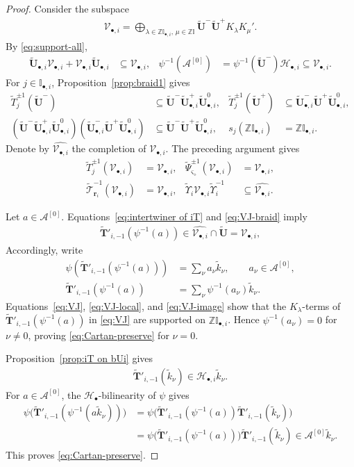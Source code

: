 \documentclass[a4paper,reqno,12pt]{amsart}
\numberwithin{equation}{section}
\theoremstyle{definition}
\theoremstyle{plain}
\theoremstyle{definition}
\def\Z{\mathbb Z}
\def\I{\mathbb I}
\def\bIi{\I_{\bullet,i}}
\def\br{\mathbf r}
\def\tU{\widetilde{\mathbf U}}
\def \tbiU{\tU_{\bullet,i}}
\def\tTD{\widetilde T}
\def\tT{\widetilde{\mathscr T}}
\def\tTT{\widetilde{\mathbf T}}
\def\tPsi{\widetilde\Psi}
\def\tk{\widetilde k}
\def\tfX{\widetilde\Upsilon}
\def\cA{\mathcal A}
\def\cH{\mathcal H}
\def\cV{\mathcal V}
\def\bvs{\boldsymbol\varsigma}
\def\dm{\diamond}
\def \bvs{{\boldsymbol{\varsigma}}}
\newcommand{\tTa}[1]{\tTT'_{#1,-1}}
\begin{document}
\begin{proof}
Consider the subspace
\begin{align}
\cV_{\bullet,i}=\bigoplus_{\lambda\in\Z \bIi,\,\mu\in\Z\I}
\tU^-\tU^+K_\lambda K_\mu'.
\label{eq:VJ}
\end{align}
By \eqref{eq:support-all},
\begin{align}
\tbiU\cV_{\bullet,i}+\cV_{\bullet,i}\tbiU&\subseteq\cV_{\bullet,i},
&\psi^{-1}(\cA^{[0]})
&=\psi^{-1}(\tU^-)\cH_{\bullet,i}\subseteq\cV_{\bullet,i}.
\label{eq:VJ-local}
\end{align}
For $j\in \bIi$, Proposition~\ref{prop:braid1} gives
\begin{align*}
\tTD_j^{\pm1}(\tU^-)&\subseteq\tU^-\tbiU^+\tbiU^0,
&\tTD_j^{\pm1}(\tU^+)&\subseteq\tbiU^-\tU^+\tbiU^0,\\
(\tU^-\tbiU^+\tbiU^0)(\tbiU^-\tU^+\tbiU^0)
&\subseteq\tU^-\tU^+\tbiU^0,
&s_j(\Z \bIi)&=\Z \bIi.
\end{align*}
Denote by $\widehat{\cV_{\bullet,i}}$ the completion of $\cV_{\bullet,i}$. 
The preceding argument gives
\begin{align}
\tTD_j^{\pm1}(\cV_{\bullet,i})&=\cV_{\bullet,i},
&\tPsi_{\bvs_\dm}^{\pm1}(\cV_{\bullet,i})&=\cV_{\bullet,i},\nonumber\\
\tT_{\br_i}^{-1}(\cV_{\bullet,i})&=\cV_{\bullet,i},
&\tfX_i\cV_{\bullet,i}\tfX_i^{-1}&\subseteq\widehat{\cV_{\bullet,i}}.
\label{eq:VJ-braid}
\end{align}

Let $a\in\cA^{[0]}$. Equations~\eqref{eq:intertwiner of iT} and \eqref{eq:VJ-braid} imply
\begin{align}
\tTa{i}(\psi^{-1}(a))
\in\widehat{\cV_{\bullet,i}}\cap\tU=\cV_{\bullet,i},
\label{eq:VJ-image}
\end{align}
Accordingly, write
\begin{align*}
\psi(\tTa{i}(\psi^{-1}(a)))
&=\sum_{\nu}a_{\nu}\tk_{\nu},
\qquad a_{\nu}\in\cA^{[0]},\\
\tTa{i}(\psi^{-1}(a))
&=\sum_{\nu}
\psi^{-1}(a_{\nu})\tk_{\nu}.
\end{align*}
Equations~\eqref{eq:VJ}, \eqref{eq:VJ-local}, and \eqref{eq:VJ-image} show that the $K_\lambda$-terms of $\tTa{i}(\psi^{-1}(a))$ in \eqref{eq:VJ} are supported on $\Z\bIi$. Hence $\psi^{-1}(a_{\nu})=0$ for $\nu\ne0$, proving \eqref{eq:Cartan-preserve} for $\nu=0$.

Proposition~\ref{prop:iT on bUi} gives
\begin{align*}
 \tTa{i}(\tk_{\nu})\in\cH_{\bullet,i}\tk_{\nu}.  
\end{align*}
For $a\in\cA^{[0]}$, the $\cH_\bullet$-bilinearity of $\psi$ gives
\begin{align*}
\psi\bigl(\tTa{i}(\psi^{-1}(a\tk_{\nu}))\bigr)
&=\psi\bigl(\tTa{i}(\psi^{-1}(a))
\tTa{i}(\tk_{\nu})\bigr)\\
&=\psi\bigl(\tTa{i}(\psi^{-1}(a))\bigr)
\tTa{i}(\tk_{\nu})
\in\cA^{[0]}\tk_{\nu}.
\end{align*}
This proves \eqref{eq:Cartan-preserve}. 
\end{proof}
\end{document}
